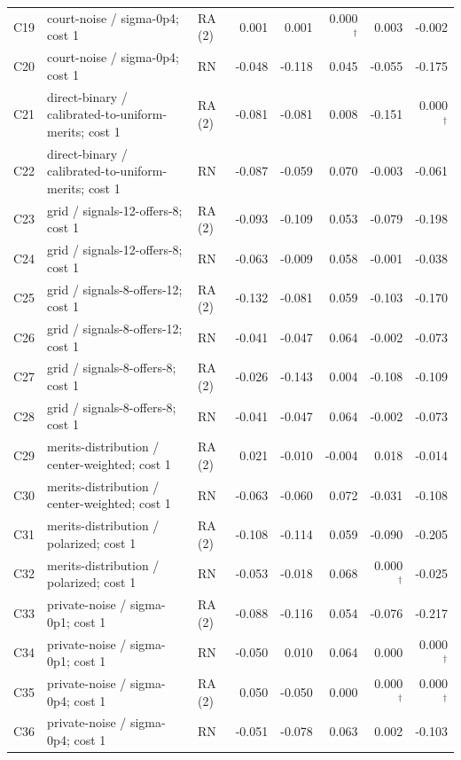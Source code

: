 \documentclass[10pt]{article}
\begin{document}
\begin{longtable}{@{}lp{3.0in}lrrrrr@{}}
C19 & court-noise / sigma-0p4; cost 1 & RA (2) & 0.001 & 0.001 & 0.000$^{\dagger}$ & 0.003 & -0.002\\
C20 & court-noise / sigma-0p4; cost 1 & RN & -0.048 & -0.118 & 0.045 & -0.055 & -0.175\\
C21 & direct-binary / calibrated-to-uniform-merits; cost 1 & RA (2) & -0.081 & -0.081 & 0.008 & -0.151 & 0.000$^{\dagger}$\\
C22 & direct-binary / calibrated-to-uniform-merits; cost 1 & RN & -0.087 & -0.059 & 0.070 & -0.003 & -0.061\\
C23 & grid / signals-12-offers-8; cost 1 & RA (2) & -0.093 & -0.109 & 0.053 & -0.079 & -0.198\\
C24 & grid / signals-12-offers-8; cost 1 & RN & -0.063 & -0.009 & 0.058 & -0.001 & -0.038\\
C25 & grid / signals-8-offers-12; cost 1 & RA (2) & -0.132 & -0.081 & 0.059 & -0.103 & -0.170\\
C26 & grid / signals-8-offers-12; cost 1 & RN & -0.041 & -0.047 & 0.064 & -0.002 & -0.073\\
C27 & grid / signals-8-offers-8; cost 1 & RA (2) & -0.026 & -0.143 & 0.004 & -0.108 & -0.109\\
C28 & grid / signals-8-offers-8; cost 1 & RN & -0.041 & -0.047 & 0.064 & -0.002 & -0.073\\
C29 & merits-distribution / center-weighted; cost 1 & RA (2) & 0.021 & -0.010 & -0.004 & 0.018 & -0.014\\
C30 & merits-distribution / center-weighted; cost 1 & RN & -0.063 & -0.060 & 0.072 & -0.031 & -0.108\\
C31 & merits-distribution / polarized; cost 1 & RA (2) & -0.108 & -0.114 & 0.059 & -0.090 & -0.205\\
C32 & merits-distribution / polarized; cost 1 & RN & -0.053 & -0.018 & 0.068 & 0.000$^{\dagger}$ & -0.025\\
C33 & private-noise / sigma-0p1; cost 1 & RA (2) & -0.088 & -0.116 & 0.054 & -0.076 & -0.217\\
C34 & private-noise / sigma-0p1; cost 1 & RN & -0.050 & 0.010 & 0.064 & 0.000 & 0.000$^{\dagger}$\\
C35 & private-noise / sigma-0p4; cost 1 & RA (2) & 0.050 & -0.050 & 0.000 & 0.000$^{\dagger}$ & 0.000$^{\dagger}$\\
C36 & private-noise / sigma-0p4; cost 1 & RN & -0.051 & -0.078 & 0.063 & 0.002 & -0.103\\
\end{longtable}\normalsize
{}\par\smallskip
\end{document}

